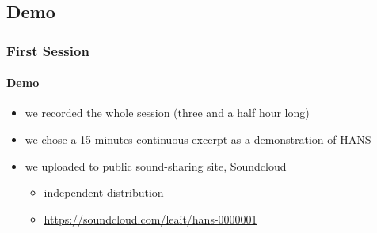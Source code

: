 \documentclass[mathserif,serif]{beamer}
\begin{document}
\begin{frame}
\begin{columns}
\begin{column}{0.48\textwidth}
\begin{figure}[h!]
       \label{fig:rec_env}
       \end{figure}
    \end{column}
\end{columns}

\end{frame}

\subsection{Demo}
\begin{frame}
\frametitle{First Session}
\framesubtitle{Demo}

\begin{itemize}
\item we recorded the whole session (three and a half hour long)
\item we chose a 15 minutes continuous excerpt as a demonstration of HANS
\item we uploaded to public sound-sharing site, Soundcloud
\begin{itemize}
\item independent distribution
\item \url{https://soundcloud.com/leait/hans-0000001}
\end{itemize}
\end{itemize}

\end{frame}
\end{document}
